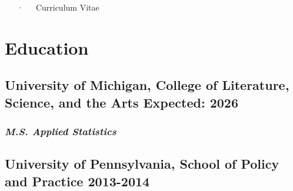 \documentclass[11pt,a4paper,]{awesome-cv}
\begin{document}
\makecvheader

\makecvfooter
  {}
    {~~~·~~~Curriculum Vitae}
  {\thepage}





\hypertarget{education}{%
\section{Education}\label{education}}

\hypertarget{university-of-michigan-college-of-literature-science-and-the-arts-expected-2026}{%
\subsection{\texorpdfstring{\textbf{University of Michigan, College of
Literature, Science, and the Arts} \hfill Expected:
2026}{University of Michigan, College of Literature, Science, and the Arts Expected: 2026}}\label{university-of-michigan-college-of-literature-science-and-the-arts-expected-2026}}

\hypertarget{m.s.-applied-statistics}{%
\subsubsection{\texorpdfstring{\emph{M.S. Applied
Statistics}}{M.S. Applied Statistics}}\label{m.s.-applied-statistics}}

\hypertarget{university-of-pennsylvania-school-of-policy-and-practice--2014}{%
\subsection{\texorpdfstring{\textbf{University of Pennsylvania, School
of Policy and Practice}
\hfill 2013-2014}{University of Pennsylvania, School of Policy and Practice -2014}}\label{university-of-pennsylvania-school-of-policy-and-practice--2014}}
\end{document}

